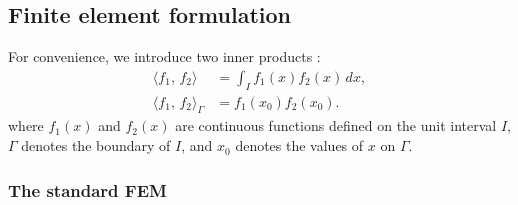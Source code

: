 \documentclass[review,3p]{elsarticle}
\begin{document}
\subsection{Finite element formulation} 	\label{FE formulation}

For convenience, we introduce two inner products \citep{lipschutz2009linear}:
 \begin{subequations}
  \begin{align}
	\langle f_1, \,f_2 \rangle &= \int _I f_1(x) f_2(x) \, dx,	\\
   \langle f_1, \,f_2 \rangle _{\Gamma} &= f_1(x_0) f_2(x_0).
  \end{align}
 \end{subequations}
where $f_1(x)$ and $f_2(x)$ are continuous functions defined on the unit interval $I$, $\Gamma$ denotes the boundary of $I$, and $x_0$ denotes the values of $x$ on $\Gamma$.

\subsubsection{The standard FEM}
\end{document}

